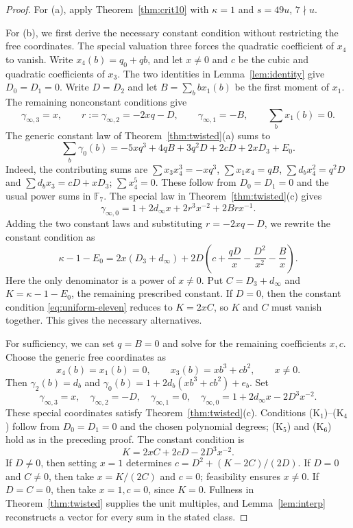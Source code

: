 \documentclass[11pt]{amsart}
\theoremstyle{plain}
\theoremstyle{definition}
\numberwithin{equation}{section}
\newcommand{\F}{\mathbb F}
\begin{document}
\begin{proof}
For (a), apply Theorem~\ref{thm:crit10} with $\kappa=1$ and
$s=49u$, $7\nmid u$.

For (b), we first derive the necessary constant condition without
restricting the free coordinates. The special valuation three
forces the quadratic coefficient of $x_4$ to vanish.
Write $x_4(b)=q_0+qb$, and let
$x\ne0$ and $c$ be the cubic and quadratic coefficients of $x_3$.
The two identities in Lemma~\ref{lem:identity} give $D_0=D_1=0$.
Write $D=D_2$ and let $B=\sum_b b x_1(b)$ be the first moment
of $x_1$. The remaining nonconstant conditions give
\[
 \gamma_{\infty,3}=x,\qquad
 r:=\gamma_{\infty,2}=-2xq-D,\qquad
 \gamma_{\infty,1}=-B,\qquad \sum_bx_1(b)=0.
\]
The generic constant law of Theorem~\ref{thm:twisted}(a) sums to
\begin{equation}\label{eq:generic-constant}
 \sum_b\gamma_0(b)
 =-5xq^3+4qB+3q^2D+2cD+2xD_3+E_0.
\end{equation}
Indeed, the contributing sums are
$\sum x_3x_4^3=-xq^3$, $\sum x_1x_4=qB$,
$\sum d_bx_4^2=q^2D$ and $\sum d_bx_3=cD+xD_3$;
$\sum x_4^5=0$. These follow from $D_0=D_1=0$ and the usual
power sums in $\F_7$.
The special law in Theorem~\ref{thm:twisted}(c) gives
\[
 \gamma_{\infty,0}
 =1+2d_\infty x+2r^3x^{-2}+2Brx^{-1}.
\]
Adding the two constant laws and substituting $r=-2xq-D$, we
rewrite the constant condition as
\begin{equation}\label{eq:uniform-eleven}
 \kappa-1-E_0
 =2x(D_3+d_\infty)
  +2D\left(c+\frac{qD}{x}-\frac{D^2}{x^2}-\frac{B}{x}\right).
\end{equation}
Here the only denominator is a power of $x\ne0$. Put
$C=D_3+d_\infty$ and $K=\kappa-1-E_0$, the remaining prescribed
constant. If $D=0$, then the constant condition
\eqref{eq:uniform-eleven} reduces to $K=2xC$, so $K$ and $C$
must vanish together. This gives the necessary alternatives.

For sufficiency, we can set $q=B=0$ and solve for the remaining
coefficients $x,c$. Choose the generic free coordinates as
\[
 x_4(b)=x_1(b)=0,\qquad x_3(b)=xb^3+cb^2,
 \qquad x\ne0.
\]
Then $\gamma_2(b)=d_b$ and
$\gamma_0(b)=1+2d_b(xb^3+cb^2)+e_b$. Set
\[
 \gamma_{\infty,3}=x,\quad \gamma_{\infty,2}=-D,\quad
 \gamma_{\infty,1}=0,\quad
 \gamma_{\infty,0}=1+2d_\infty x-2D^3x^{-2}.
\]
These special coordinates satisfy Theorem~\ref{thm:twisted}(c).
Conditions (K$_1$)--(K$_4$) follow from
$D_0=D_1=0$ and the chosen polynomial degrees; (K$_5$) and
(K$_6$) hold as in the preceding proof. The constant condition is
\begin{equation}\label{eq:explicit-eleven}
 K=2xC+2cD-2D^3x^{-2}.
\end{equation}
If $D\ne0$, then setting $x=1$ determines
$c=D^2+(K-2C)/(2D)$.
If $D=0$ and $C\ne0$, then take $x=K/(2C)$ and $c=0$;
feasibility ensures $x\ne0$. If $D=C=0$, then take $x=1,c=0$,
since $K=0$.
Fullness in Theorem~\ref{thm:twisted} supplies the unit multiples,
and Lemma~\ref{lem:interp} reconstructs a vector for every sum
in the stated class.
\end{proof}
\end{document}
